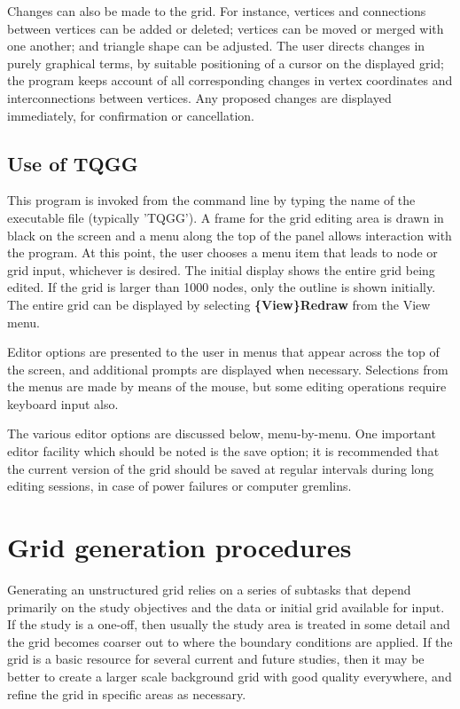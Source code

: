 \documentclass{article}
\begin{document}
Changes can also be made to the grid. For instance, vertices and connections between vertices can be added or deleted; vertices can be moved or merged with one another; and triangle shape can be adjusted. The user directs changes in purely graphical terms, by suitable positioning of a cursor on the displayed grid; the program keeps account of all corresponding changes in vertex coordinates and interconnections between vertices. Any proposed changes are displayed immediately, for confirmation or cancellation.

\subsection{Use of TQGG}
This program is invoked from the command line by typing the name of the executable file (typically 'TQGG'). A frame for the grid editing area is drawn in black on the screen and a menu along the top of the panel allows interaction with the program. At this point, the user chooses a menu item that leads to node or grid input, whichever is desired. The initial display shows the entire grid being edited.  If the grid is larger than 1000 nodes, only the outline is shown initially. The entire grid can be displayed by selecting \textbf{\{View\}Redraw} from the View menu.

Editor options are presented to the user in menus that appear across the top of the screen, and additional prompts are displayed when necessary. Selections from the menus are made by means of the mouse, but some editing operations require keyboard input also.

The various editor options are discussed below, menu-by-menu. One important editor facility which should be noted is the save option; it is recommended that the current version of the grid should be saved at regular intervals during long editing sessions, in case of power failures or computer gremlins.

\section{Grid generation procedures}

Generating an unstructured grid relies on a series of subtasks that depend primarily on the study objectives and the
data or initial grid available for input. If the study is a one-off, then usually the study area is treated in some detail and the
grid becomes coarser out to where the boundary conditions are applied. If the grid is a basic resource for several
current and future studies, then it may be better to create a larger scale background grid with good quality everywhere,
and refine the grid in specific areas as necessary.
\end{document}

